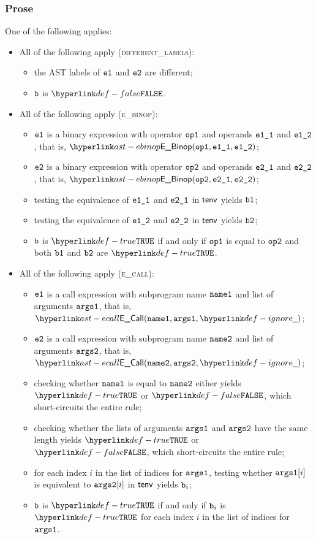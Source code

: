 \subsubsection{Prose}
One of the following applies:
\begin{itemize}
  \item All of the following apply (\textsc{different\_labels}):
  \begin{itemize}
    \item the AST labels of $\texttt{e1}$ and $\texttt{e2}$ are different;
    \item $\texttt{b}$ is $\False$.
  \end{itemize}

  \item All of the following apply (\textsc{e\_binop}):
  \begin{itemize}
    \item $\texttt{e1}$ is a binary expression with operator $\texttt{op1}$ and operands $\texttt{e1\_1}$ and $\texttt{e1\_2}$,
          that is, $\EBinop(\opone, \veoneone, \veonetwo)$;
    \item $\texttt{e2}$ is a binary expression with operator $\texttt{op2}$ and operands $\texttt{e2\_1}$ and $\texttt{e2\_2}$,
          that is, $\EBinop(\optwo, \vetwoone, \vetwotwo)$;
    \item testing the equivalence of $\texttt{e1\_1}$ and $\texttt{e2\_1}$ in $\textsf{tenv}$ yields $\texttt{b1}$\ProseOrTypeError;
    \item testing the equivalence of $\texttt{e1\_2}$ and $\texttt{e2\_2}$ in $\textsf{tenv}$ yields $\texttt{b2}$\ProseOrTypeError;
    \item $\texttt{b}$ is $\True$ if and only if $\texttt{op1}$ is equal to $\texttt{op2}$ and both $\texttt{b1}$ and $\texttt{b2}$ are $\True$.
  \end{itemize}

  \item All of the following apply (\textsc{e\_call}):
  \begin{itemize}
    \item $\texttt{e1}$ is a call expression with subprogram name $\texttt{name1}$ and list of arguments $\texttt{args1}$,
          that is, $\ECall(\nameone, \vargsone, \Ignore)$;
    \item $\texttt{e2}$ is a call expression with subprogram name $\texttt{name2}$ and list of arguments $\texttt{args2}$,
          that is, $\ECall(\nametwo, \vargstwo, \Ignore)$;
    \item checking whether $\texttt{name1}$ is equal to $\texttt{name2}$ either yields $\True$ or $\False$, which short-circuits the entire rule;
    \item checking whether the lists of arguments $\texttt{args1}$ and $\texttt{args2}$ have the same length yields
          $\True$ or $\False$, which short-circuits the entire rule;
    \item for each index $i$ in the list of indices for $\texttt{args1}$, testing whether $\texttt{args1}[i]$ is equivalent to $\texttt{args2}[i]$
          in $\textsf{tenv}$ yields $\texttt{b}_i$\ProseOrTypeError;
    \item $\texttt{b}$ is $\True$ if and only if $\texttt{b}_i$ is $\True$ for each index $i$ in the list of indices for $\texttt{args1}$.
  \end{itemize}


\end{itemize}
